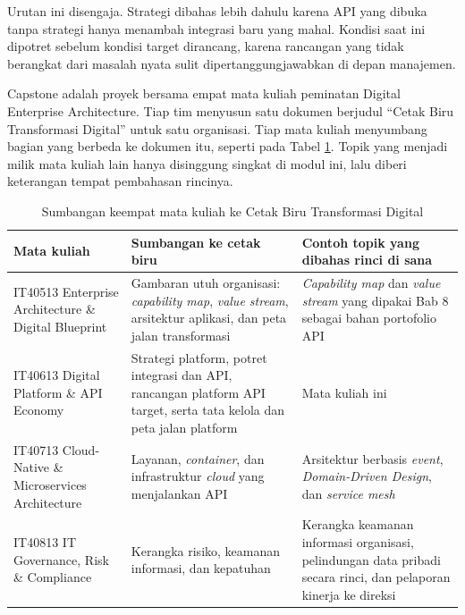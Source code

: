 Urutan ini disengaja. Strategi dibahas lebih dahulu karena API yang dibuka tanpa
strategi hanya menambah integrasi baru yang mahal. Kondisi saat ini dipotret
sebelum kondisi target dirancang, karena rancangan yang tidak berangkat dari
masalah nyata sulit dipertanggungjawabkan di depan manajemen.

Capstone adalah proyek bersama empat mata kuliah peminatan Digital Enterprise
Architecture. Tiap tim menyusun satu dokumen berjudul ``Cetak Biru Transformasi
Digital'' untuk satu organisasi. Tiap mata kuliah menyumbang bagian yang berbeda
ke dokumen itu, seperti pada Tabel \ref{tab:ch01-pembagian}. Topik yang menjadi
milik mata kuliah lain hanya disinggung singkat di modul ini, lalu diberi
keterangan tempat pembahasan rincinya.

\begin{table}[!htb]
  \centering
  \caption{Sumbangan keempat mata kuliah ke Cetak Biru Transformasi Digital}
  \label{tab:ch01-pembagian}
  \begin{tabularx}{\textwidth}{>{\raggedright\arraybackslash}p{3.0cm}
                               >{\raggedright\arraybackslash}X
                               >{\raggedright\arraybackslash}X}
    \hline
    \textbf{Mata kuliah} & \textbf{Sumbangan ke cetak biru} & \textbf{Contoh topik yang dibahas rinci di sana} \\
    \hline
    IT40513 Enterprise Architecture \& Digital Blueprint & Gambaran utuh organisasi: \textit{capability map}, \textit{value stream}, arsitektur aplikasi, dan peta jalan transformasi & \textit{Capability map} dan \textit{value stream} yang dipakai Bab 8 sebagai bahan portofolio API \\
    \hline
    IT40613 Digital Platform \& API Economy & Strategi platform, potret integrasi dan API, rancangan platform API target, serta tata kelola dan peta jalan platform & Mata kuliah ini \\
    \hline
    IT40713 Cloud-Native \& Microservices Architecture & Layanan, \textit{container}, dan infrastruktur \textit{cloud} yang menjalankan API & Arsitektur berbasis \textit{event}, \textit{Domain-Driven Design}, dan \textit{service mesh} \\
    \hline
    IT40813 IT Governance, Risk \& Compliance & Kerangka risiko, keamanan informasi, dan kepatuhan & Kerangka keamanan informasi organisasi, pelindungan data pribadi secara rinci, dan pelaporan kinerja ke direksi \\
    \hline
  \end{tabularx}
\end{table}


